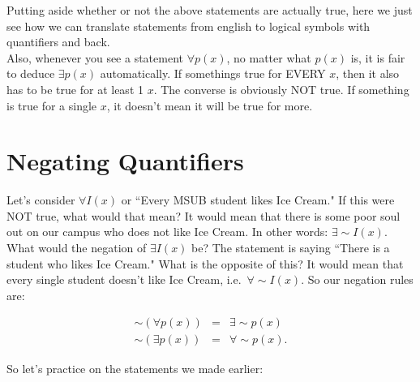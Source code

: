 \documentclass[10pt]{article}
\theoremstyle{definition}
\begin{document}
Putting aside whether or not the above statements are actually true, here we just see how we can translate statements from english to logical symbols with quantifiers and back.\\

Also, whenever you see a statement $\forall p(x)$, no matter what $p(x)$ is, it is fair to deduce $\exists p(x)$ automatically.  If somethings true for EVERY $x$, then it also has to be true for at least 1 $x$.  The converse is obviously NOT true.  If something is true for a single $x$, it doesn't mean it will be true for more.


\section{Negating Quantifiers}

Let's consider $\forall I(x)$ or ``Every MSUB student likes Ice Cream."   If this were NOT true, what would that mean?  It would mean that there is some poor soul out on our campus who does not like Ice Cream.  In other words: $\exists \sim I(x)$.\\

What would the negation of $\exists I(x)$ be?  The statement is saying ``There is a student who likes Ice Cream."  What is the opposite of this?  It would mean that every single student doesn't like Ice Cream, i.e.\ $\forall \sim I(x)$.  So our negation rules are:

\begin{eqnarray*}
\sim(\forall p(x))&=&\exists \sim p(x)\\
\sim(\exists p(x))&=&\forall \sim p(x).
\end{eqnarray*}

So let's practice on the statements we made earlier:
\end{document}
